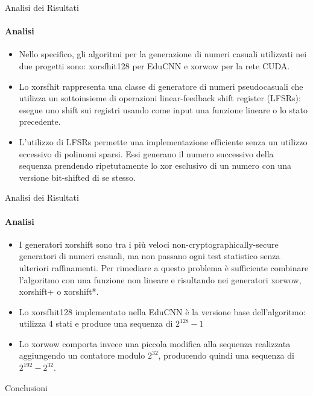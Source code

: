 \documentclass[
 ]{beamer}
\begin{document}
\begin{frame}{Analisi dei Risultati}
    \framesubtitle{Analisi}
    \smallskip
    \begin{itemize} [<+->]
        \setlength\itemsep{2em}
        \item \large Nello specifico, gli algoritmi per la generazione di numeri casuali utilizzati nei due progetti sono: xorsfhit128 per EduCNN e xorwow per la rete CUDA.
        \item \large Lo xorsfhit rappresenta una classe di generatore di numeri pseudocasuali che utilizza un sottoinsieme di operazioni linear-feedback shift register (LFSRs): esegue uno shift sui registri usando come input una funzione lineare o lo stato precedente.
        \item \large L'utilizzo di LFSRs permette una implementazione efficiente senza un utilizzo eccessivo di polinomi sparsi. Essi generano il numero successivo della sequenza prendendo ripetutamente lo xor esclusivo di un numero con una versione bit-shifted di se stesso.
    \end{itemize}     
\end{frame}

\begin{frame}{Analisi dei Risultati}
    \framesubtitle{Analisi}
    \smallskip
    \begin{itemize} [<+->]
        \setlength\itemsep{2em}
        \item \large I generatori xorshift sono tra i più veloci non-cryptographically-secure generatori di numeri casuali, ma non passano ogni test statistico senza ulteriori raffinamenti. Per rimediare a questo problema è sufficiente combinare l'algoritmo con una funzione non lineare e risultando nei generatori xorwow, xorshift+ o xorshift*.
        \item \large Lo xorsfhit128 implementato nella EduCNN è la versione base dell'algoritmo: utilizza 4 stati e produce una sequenza di $2_{}^{128}-1$
        \item \large Lo xorwow comporta invece una piccola modifica alla sequenza realizzata aggiungendo un contatore modulo $2_{}^{32}$, producendo quindi una sequenza di $2_{}^{192}-2_{}^{32}$.
    \end{itemize}     
\end{frame}

\begin{frame}[c]
  \centering
  \bigskip \bigskip    
  \Huge Conclusioni
\end{frame}
\end{document}
